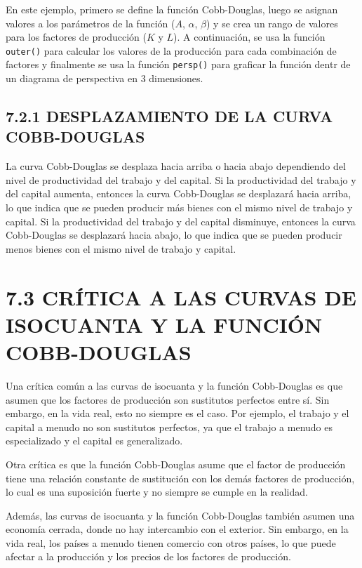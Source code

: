 \documentclass[
  spanish,
  12pt,
]{book}
\begin{document}
En este ejemplo, primero se define la función Cobb-Douglas, luego se
asignan valores a los parámetros de la función (\(A\), \(\alpha\),
\(\beta\)) y se crea un rango de valores para los factores de producción
(\(K\) y \(L\)). A continuación, se usa la función \texttt{outer()} para
calcular los valores de la producción para cada combinación de factores
y finalmente se usa la función \texttt{persp()} para graficar la función
dentr de un diagrama de perspectiva en 3 dimensiones.

\subsection{7.2.1 DESPLAZAMIENTO DE LA CURVA
COBB-DOUGLAS}\label{desplazamiento-de-la-curva-cobb-douglas}

La curva Cobb-Douglas se desplaza hacia arriba o hacia abajo dependiendo
del nivel de productividad del trabajo y del capital. Si la
productividad del trabajo y del capital aumenta, entonces la curva
Cobb-Douglas se desplazará hacia arriba, lo que indica que se pueden
producir más bienes con el mismo nivel de trabajo y capital. Si la
productividad del trabajo y del capital disminuye, entonces la curva
Cobb-Douglas se desplazará hacia abajo, lo que indica que se pueden
producir menos bienes con el mismo nivel de trabajo y capital.

\section{7.3 CRÍTICA A LAS CURVAS DE ISOCUANTA Y LA FUNCIÓN
COBB-DOUGLAS}\label{cruxedtica-a-las-curvas-de-isocuanta-y-la-funciuxf3n-cobb-douglas}

Una crítica común a las curvas de isocuanta y la función Cobb-Douglas es
que asumen que los factores de producción son sustitutos perfectos entre
sí. Sin embargo, en la vida real, esto no siempre es el caso. Por
ejemplo, el trabajo y el capital a menudo no son sustitutos perfectos,
ya que el trabajo a menudo es especializado y el capital es
generalizado.

Otra crítica es que la función Cobb-Douglas asume que el factor de
producción tiene una relación constante de sustitución con los demás
factores de producción, lo cual es una suposición fuerte y no siempre se
cumple en la realidad.

Además, las curvas de isocuanta y la función Cobb-Douglas también asumen
una economía cerrada, donde no hay intercambio con el exterior. Sin
embargo, en la vida real, los países a menudo tienen comercio con otros
países, lo que puede afectar a la producción y los precios de los
factores de producción.
\end{document}
